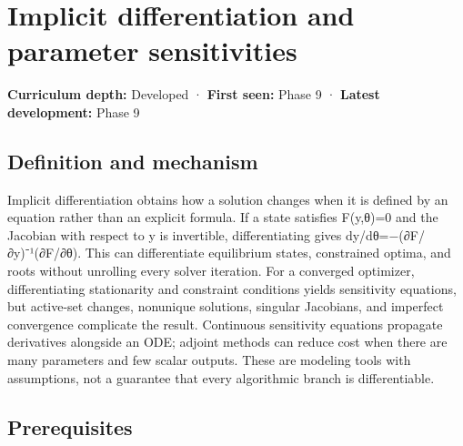\hypertarget{appendix-8836553d56fc}{}\label{referencestart:appendix-8836553d56fc}
\section{Implicit differentiation and parameter sensitivities}\label{appendix-8836553d56fc-implicit-differentiation-and-parameter-sensitivities}

\hypertarget{appendix-8836553d56fc-implicit-differentiation-and-parameter-sensitivities}{}

\textbf{Curriculum depth:} Developed · \textbf{First seen:} Phase 9 · \textbf{Latest development:} Phase 9

\begin{allmightroledefinition}

\subsection{Definition and mechanism}\label{appendix-8836553d56fc-definition-and-mechanism}

\hypertarget{appendix-8836553d56fc-definition-and-mechanism}{}

Implicit differentiation obtains how a solution changes when it is defined by an equation rather than an explicit formula. If a state satisfies F(y,θ)=0 and the Jacobian with respect to y is invertible, differentiating gives dy/dθ=−(∂F/∂y)⁻¹(∂F/∂θ). This can differentiate equilibrium states, constrained optima, and roots without unrolling every solver iteration. For a converged optimizer, differentiating stationarity and constraint conditions yields sensitivity equations, but active-set changes, nonunique solutions, singular Jacobians, and imperfect convergence complicate the result. Continuous sensitivity equations propagate derivatives alongside an ODE; adjoint methods can reduce cost when there are many parameters and few scalar outputs. These are modeling tools with assumptions, not a guarantee that every algorithmic branch is differentiable.

\end{allmightroledefinition}

\subsection{Prerequisites}\label{appendix-8836553d56fc-prerequisites}

\hypertarget{appendix-8836553d56fc-prerequisites}{}

